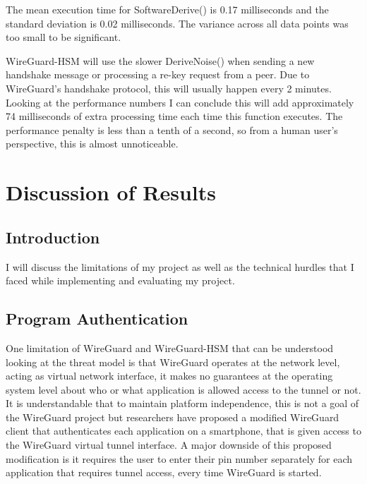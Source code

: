 \documentclass [11pt, proquest] {uwthesis}[2020/02/24]
\begin{document}
The mean execution time for SoftwareDerive() is 0.17 milliseconds and the standard deviation is 0.02 milliseconds. The variance across all data points was too small to be significant.

WireGuard-HSM will use the slower DeriveNoise() when sending a new handshake message or processing a re-key request from a peer. Due to WireGuard's handshake protocol, this will usually happen every 2 minutes. Looking at the performance numbers I can conclude this will add approximately 74 milliseconds of extra processing time each time this function executes. The performance penalty is less than a tenth of a second, so from a human user's perspective, this is almost unnoticeable. 

\chapter {Discussion of Results}
\section {Introduction}
I will discuss the limitations of my project as well as the technical hurdles that I faced while implementing and evaluating my project.

\section{Program Authentication}
One limitation of WireGuard and WireGuard-HSM that can be understood looking at the threat model is that WireGuard operates at the network level, acting as virtual network interface, it makes no guarantees at the operating system level about who or what application is allowed access to the tunnel or not. It is understandable that to maintain platform independence, this is not a goal of the WireGuard project but researchers have proposed a modified WireGuard client that authenticates each application on a smartphone, that is given access to the WireGuard virtual tunnel interface. A major downside of this proposed modification is it requires the user to enter their pin number separately for each application that requires tunnel access, every time WireGuard is started.\cite{wu_sewg_2020}
\end{document}

